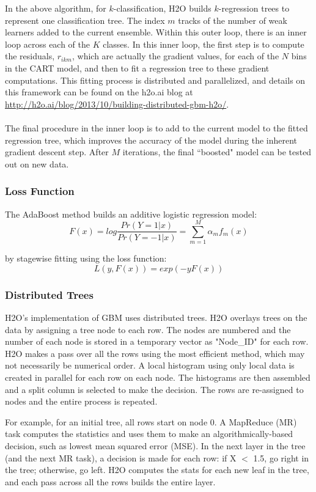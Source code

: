\documentclass{article}[11pt]
\begin{document}
{In the above algorithm, for $k$-classification, H2O builds $k$-regression trees to represent one classification tree. The index $m$ tracks of the number of weak learners added to the current ensemble. Within this outer loop, there is an inner loop across each of the $K$ classes. In this inner loop, the first step is to compute the residuals, $r_{ikm}$, which are actually the gradient values, for each of the $N$ bins in the CART model, and then to fit a regression tree to these gradient computations. This fitting process is distributed and parallelized, and details on this framework can be found on the h2o.ai blog at {\url{http://h2o.ai/blog/2013/10/building-distributed-gbm-h2o/}}.
\\
\\
The final procedure in the inner loop is to add to the current model to the fitted regression tree, which improves the accuracy of the model during the inherent gradient descent step. After $M$ iterations, the final ``boosted" model can be tested out on new data.

\subsubsection{Loss Function}
The AdaBoost method builds an additive logistic regression model:
$${F(x) = log}\frac{Pr(Y = 1|x)}{Pr(Y = -1|x)} = \sum_{m=1}^{M} \alpha_m f_m (x) $$

by stagewise fitting using the loss function: 
$$L(y, F(x)) = exp(-y  F (x)) $$



\subsubsection{Distributed Trees}

H2O's implementation of GBM uses distributed trees. H2O overlays trees on the data by assigning a tree node to each row. The nodes are numbered and the number of each node is stored in a temporary vector as "Node\_ID" for each row. H2O makes a pass over all the rows using the most efficient method, which may not necessarily be  numerical order. A local histogram using only local data is created in parallel for each row on each node. The histograms are then assembled and a split column is selected to make the decision. The rows are re-assigned to nodes and the entire process is repeated. 

For example, for an initial tree, all rows start on node 0. A MapReduce (MR) task computes the statistics and uses them to make an algorithmically-based decision, such as lowest mean squared error (MSE). In the next layer in the tree (and the next MR task), a decision is made for each row: if X $<$ 1.5, go right in the tree; otherwise, go left. H2O computes the stats for each new leaf in the tree, and each pass across all the rows builds the entire layer. 

}
\end{document}

